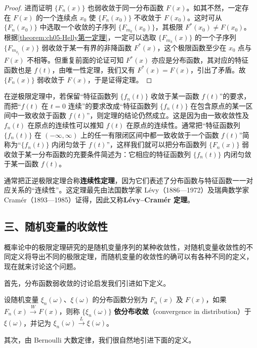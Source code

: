 \documentclass[../../main.tex]{subfiles}
\begin{document}
\begin{proof}
进而证明 $\{F_n(x)\}$ 也弱收敛于同一分布函数 $F(x)$。如其不然，一定存在 $F(x)$ 的一个连续点 $x_0$ 使 $\{F_n(x_0)\}$ 不收敛于 $F(x_0)$。这时可从 $\{F_n(x_0)\}$ 中选取一个收敛的子序列 $\{F_{m_k}(x_0)\}$，其极限 $F^*(x_0)\neq F(x_0)$。根据\cref{theorem:ch05-Helly第一定理}，一定可以选取 $\{F_{m_k}(x)\}$ 的一个子序列 $\{F_{m_{k_j}}(x)\}$ 弱收敛于某一有界的非降函数 $F^*(x)$，这个极限函数至少在 $x_0$ 点与 $F(x)$ 不相等。但重复前面的论证可知 $F^*(x)$ 亦应是分布函数，其对应的特征函数也是 $f(t)$，由唯一性定理，我们又有 $F^*(x)=F(x)$，引出了矛盾。故 $\{F_n(x)\}$ 弱收敛于 $F(x)$，于是证得定理。
\end{proof}

在逆极限定理中，若保留``特征函数列 $\{f_n(t)\}$ 收敛于某一函数 $f(t)$''的要求，而把``$f(t)$ 在 $t=0$ 连续''的要求改成``特征函数列 $\{f_n(t)\}$ 在包含原点的某一区间中一致收敛于函数 $f(t)$''，则定理的结论仍然成立。这是因为由一致收敛性及 $f_n(t)$ 在原点的连续性可以推知 $f(t)$ 在原点的连续性。通常把``特征函数列 $\{f_n(t)\}$ 在 $(-\infty,\infty)$ 上的任一有限闭区间中都一致收敛于一个函数 $f(t)$''简称为``$\{f_n(t)\}$ 内闭匀敛于 $f(t)$''，这样我们就可以把分布函数列 $\{F_n(x)\}$ 弱收敛于某一分布函数的充要条件简述为：它相应的特征函数列 $\{f_n(t)\}$ 内闭匀敛于某一函数 $f(t)$。

通常把正逆极限定理合称\textbf{连续性定理}，因为它们表述了分布函数与特征函数一一对应关系的``连续性''。这定理最先由法国数学家 Lévy（1886—1972）及瑞典数学家 Cramér（1893—1985）证得，因此又称\textbf{Lévy--Cramér 定理}。

\subsection*{三、随机变量的收敛性}

概率论中的极限定理研究的是随机变量序列的某种收敛性，对随机变量收敛性的不同定义将导出不同的极限定理，而随机变量的收敛性的确可以有各种不同的定义，现在就来讨论这个问题。

首先，分布函数弱收敛的讨论启发我们引进如下定义。

\begin{definition}[依分布收敛]\label{definition:ch05-依分布收敛}
设随机变量 $\xi_n(\omega)$、$\xi(\omega)$ 的分布函数分别为 $F_n(x)$ 及 $F(x)$，如果 $F_n(x)\xrightarrow{W}F(x)$，则称 $\{\xi_n(\omega)\}$ \textbf{依分布收敛}（convergence in distribution）于 $\xi(\omega)$，并记为 $\xi_n(\omega)\xrightarrow{L}\xi(\omega)$。
\end{definition}

其次，由 Bernoulli 大数定律，我们很自然地引进下面的定义。
\end{document}
